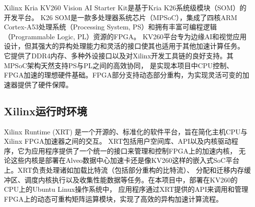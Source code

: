 Xilinx Kria KV260 Vision AI Starter Kit是基于Kria K26系统级模块（SOM）的开发平台。
K26 SOM是一款多处理器系统芯片（MPSoC），集成了四核ARM Cortex-A53处理系统（Processing System, PS）和拥有丰富可编程逻辑（Programmable Logic, PL）资源的FPGA。
KV260平台专为边缘AI和视觉应用设计，但其强大的异构处理能力和灵活的接口使其也适用于其他加速计算任务。
它提供了DDR4内存、多种外设接口以及对Xilinx开发工具链的良好支持。其MPSoC架构天然支持PS与PL之间的高效协同，
是实现本项目中CPU控制、FPGA加速的理想硬件基础。FPGA部分支持动态部分重构，为实现灵活可变的加速器提供了硬件保障。

\subsection{Xilinx运行时环境}

Xilinx Runtime (XRT) 是一个开源的、标准化的软件平台，旨在简化主机CPU与Xilinx FPGA加速器之间的交互。
XRT包括用户空间库、API以及内核驱动程序，它为应用程序提供了一个统一的接口来管理和控制FPGA上的加速内核，
无论这些内核是部署在Alveo数据中心加速卡还是像KV260这样的嵌入式SoC平台上。XRT负责处理诸如加载比特流（包括部分重构的比特流）、
分配和迁移内存缓冲区、调度内核执行以及收集性能数据等任务。在本项目中，部署在KV260的CPU上的Ubuntu Linux操作系统中，
应用程序通过XRT提供的API来调用和管理FPGA上的动态可重构矩阵运算模块，实现了高效的异构加速计算流程。

